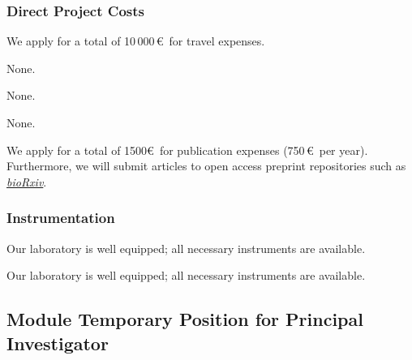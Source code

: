 \documentclass{scrartcl}
\begin{document}
\subsubsection{Direct Project Costs}
\begin{funds}



We apply for a total of 10\,000\,\euro\ for travel expenses.

None.

None.

None.

We apply for a total of 1500\euro\ for publication expenses (750\,\euro\ per
year). Furthermore, we will submit articles to open access preprint repositories
such as \href{https://www.biorxiv.org/}{\textit{bioRxiv}}.

\end{funds}

\subsubsection{Instrumentation}

Our laboratory is well equipped; all necessary instruments are available.

Our laboratory is well equipped; all necessary instruments are available.



\vspace*{2cm}

\subsection{Module Temporary Position for Principal Investigator}
\end{document}
